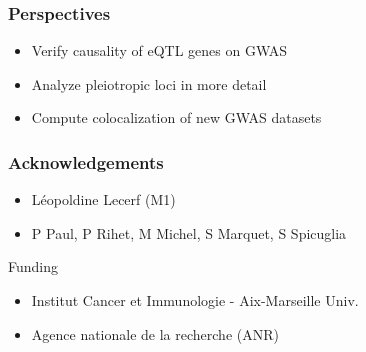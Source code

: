 \documentclass{beamer}
\newcommand*{\floatRelativePath}{../out/gwas417/pval_5e-08/r2_0.1/kb_1000/window_1000000/75_50}%
\begin{document}
    \begin{frame}
        \frametitle{Perspectives}

        \begin{itemize}
            \item Verify causality of eQTL genes on GWAS
            \item Analyze pleiotropic loci in more detail
            \item Compute colocalization of new GWAS datasets
        \end{itemize}

    \end{frame}

    \begin{frame}
        \frametitle{Acknowledgements}

        \begin{itemize}
            \item L\'eopoldine Lecerf (M1)
            \item P Paul, P Rihet, M Michel, S Marquet, S Spicuglia
        \end{itemize}
%
        \vfill
%
        Funding
%
        \begin{itemize}
            \item Institut Cancer et Immunologie - Aix-Marseille Univ.
            \item Agence nationale de la recherche (ANR)
        \end{itemize}

    \end{frame}

    \begin{frame}
        \frametitle{}

    \end{frame}

%
%
\end{document}
